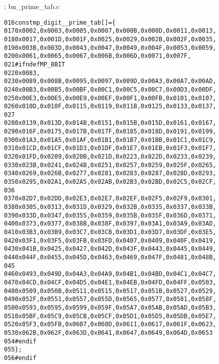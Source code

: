\documentclass[b5paper]{book}
\begin{document}
\vspace{+3mm}\begin{small}
\hspace{-5.1mm}{\bf File}: bn\_prime\_tab.c
\vspace{-3mm}
\begin{alltt}
016   const mp_digit __prime_tab[] = \{
017     0x0002, 0x0003, 0x0005, 0x0007, 0x000B, 0x000D, 0x0011, 0x0013,
018     0x0017, 0x001D, 0x001F, 0x0025, 0x0029, 0x002B, 0x002F, 0x0035,
019     0x003B, 0x003D, 0x0043, 0x0047, 0x0049, 0x004F, 0x0053, 0x0059,
020     0x0061, 0x0065, 0x0067, 0x006B, 0x006D, 0x0071, 0x007F,
021   #ifndef MP_8BIT
022     0x0083,
023     0x0089, 0x008B, 0x0095, 0x0097, 0x009D, 0x00A3, 0x00A7, 0x00AD,
024     0x00B3, 0x00B5, 0x00BF, 0x00C1, 0x00C5, 0x00C7, 0x00D3, 0x00DF,
025     0x00E3, 0x00E5, 0x00E9, 0x00EF, 0x00F1, 0x00FB, 0x0101, 0x0107,
026     0x010D, 0x010F, 0x0115, 0x0119, 0x011B, 0x0125, 0x0133, 0x0137,
027   
028     0x0139, 0x013D, 0x014B, 0x0151, 0x015B, 0x015D, 0x0161, 0x0167,
029     0x016F, 0x0175, 0x017B, 0x017F, 0x0185, 0x018D, 0x0191, 0x0199,
030     0x01A3, 0x01A5, 0x01AF, 0x01B1, 0x01B7, 0x01BB, 0x01C1, 0x01C9,
031     0x01CD, 0x01CF, 0x01D3, 0x01DF, 0x01E7, 0x01EB, 0x01F3, 0x01F7,
032     0x01FD, 0x0209, 0x020B, 0x021D, 0x0223, 0x022D, 0x0233, 0x0239,
033     0x023B, 0x0241, 0x024B, 0x0251, 0x0257, 0x0259, 0x025F, 0x0265,
034     0x0269, 0x026B, 0x0277, 0x0281, 0x0283, 0x0287, 0x028D, 0x0293,
035     0x0295, 0x02A1, 0x02A5, 0x02AB, 0x02B3, 0x02BD, 0x02C5, 0x02CF,
036   
037     0x02D7, 0x02DD, 0x02E3, 0x02E7, 0x02EF, 0x02F5, 0x02F9, 0x0301,
038     0x0305, 0x0313, 0x031D, 0x0329, 0x032B, 0x0335, 0x0337, 0x033B,
039     0x033D, 0x0347, 0x0355, 0x0359, 0x035B, 0x035F, 0x036D, 0x0371,
040     0x0373, 0x0377, 0x038B, 0x038F, 0x0397, 0x03A1, 0x03A9, 0x03AD,
041     0x03B3, 0x03B9, 0x03C7, 0x03CB, 0x03D1, 0x03D7, 0x03DF, 0x03E5,
042     0x03F1, 0x03F5, 0x03FB, 0x03FD, 0x0407, 0x0409, 0x040F, 0x0419,
043     0x041B, 0x0425, 0x0427, 0x042D, 0x043F, 0x0443, 0x0445, 0x0449,
044     0x044F, 0x0455, 0x045D, 0x0463, 0x0469, 0x047F, 0x0481, 0x048B,
045   
046     0x0493, 0x049D, 0x04A3, 0x04A9, 0x04B1, 0x04BD, 0x04C1, 0x04C7,
047     0x04CD, 0x04CF, 0x04D5, 0x04E1, 0x04EB, 0x04FD, 0x04FF, 0x0503,
048     0x0509, 0x050B, 0x0511, 0x0515, 0x0517, 0x051B, 0x0527, 0x0529,
049     0x052F, 0x0551, 0x0557, 0x055D, 0x0565, 0x0577, 0x0581, 0x058F,
050     0x0593, 0x0595, 0x0599, 0x059F, 0x05A7, 0x05AB, 0x05AD, 0x05B3,
051     0x05BF, 0x05C9, 0x05CB, 0x05CF, 0x05D1, 0x05D5, 0x05DB, 0x05E7,
052     0x05F3, 0x05FB, 0x0607, 0x060D, 0x0611, 0x0617, 0x061F, 0x0623,
053     0x062B, 0x062F, 0x063D, 0x0641, 0x0647, 0x0649, 0x064D, 0x0653
054   #endif
055   \};
056   #endif
\end{alltt}
\end{small}
\end{document}
